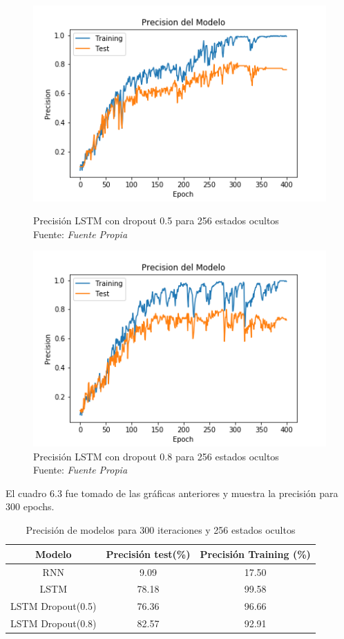 \begin{figure}[H]
	\centering
	\includegraphics[width=0.7\linewidth]{Figures/lstm5_256_13prec}
	\caption{Precisión LSTM con dropout 0.5 para 256 estados ocultos\\ Fuente: {\textit{Fuente Propia}}}
	\label{fig:lstm525613prec}
	\centering
	\includegraphics[width=0.7\linewidth]{Figures/lst_256_13prec}
	\caption{Precisión LSTM con dropout 0.8 para 256 estados ocultos\\ Fuente: {\textit{Fuente Propia}}}
	\label{fig:lst25613prec}
\end{figure}

El cuadro 6.3 fue tomado de las gráficas anteriores y muestra la precisión para 300 epochs.
\begin{table}[H]
	\centering
	\begin{tabular}{|c|c|c|}
		\hline
		\rowcolor{Gray}  Modelo & Precisión test(\%) & Precisión Training (\%)\\ \hline
		RNN &        9.09  &             17.50      \\ \hline
		
		LSTM &        78.18  &          99.58         \\ \hline
		
		LSTM Dropout(0.5) &  76.36         &     96.66         \\ \hline
		
		LSTM Dropout(0.8) &	82.57		&	92.91		\\ \hline
		
	\end{tabular}
	\caption{Precisión de modelos para 300 iteraciones y 256 estados ocultos}
\end{table}

